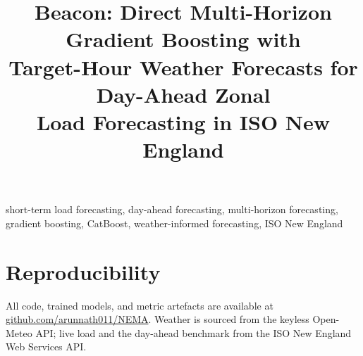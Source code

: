 \documentclass[conference]{IEEEtran}
\title{Beacon: Direct Multi-Horizon Gradient Boosting with\\
Target-Hour Weather Forecasts for Day-Ahead Zonal\\
Load Forecasting in ISO New England}
\author{\IEEEauthorblockN{Arun Surendranath}
\IEEEauthorblockA{Independent Researcher\\
\href{https://github.com/arunnath011/NEMA}{github.com/arunnath011/NEMA}}}
\begin{document}
\maketitle

\begin{abstract}

\end{abstract}

\begin{IEEEkeywords}
short-term load forecasting, day-ahead forecasting, multi-horizon forecasting,
gradient boosting, CatBoost, weather-informed forecasting, ISO New England
\end{IEEEkeywords}











\section*{Reproducibility}
All code, trained models, and metric artefacts are available at
\href{https://github.com/arunnath011/NEMA}{github.com/arunnath011/NEMA}. Weather is
sourced from the keyless Open-Meteo API; live load and the day-ahead benchmark from
the ISO New England Web Services API.



\end{document}
